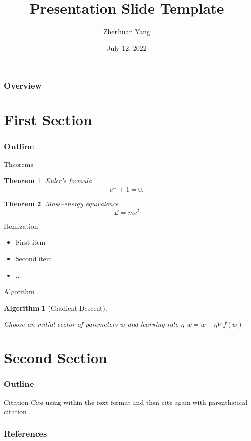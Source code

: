 \documentclass{beamer}
\title[Presentation]{Presentation Slide Template}
\author[ZY]{Zhenhuan Yang}
\institute[UAlbany]{Department of Mathematics \& Statistics\\University at Albany, SUNY}
\date{July 12, 2022}
\theoremstyle{mystyle}
\newtheorem{thm}{Theorem}
\newtheorem{code}{Algorithm}
\begin{document}
% 


\begin{frame}
	\titlepage
\end{frame}


\begin{frame}
	\frametitle{Overview}
	\tableofcontents
\end{frame}

\section[First]{First Section}

\begin{frame}
	\frametitle{Outline}
	\tableofcontents[currentsection]
\end{frame}

\begin{frame}{Theorems}
\begin{thm}\label{thm:euler}
Euler's formula
\[
	e^{i\pi} + 1 = 0.
\]
\end{thm}
\begin{thm}\label{thm:einstein}
Mass–energy equivalence
\[
	E = mc^2
\]
\end{thm}
\end{frame}

\begin{frame}{Itemization}
\begin{itemize}
\item First item 
\item Second item
\item ...	
\end{itemize}
	
\end{frame}

\begin{frame}{Algorithm}
\begin{code}[Gradient Descent]
\begin{algorithmic}[1]
\STATE Choose an initial vector of parameters $w$ and learning rate $\eta$
\STATE $w = w - \eta\nabla f(w)$
\ENDWHILE
\end{algorithmic}
\end{code}

\end{frame}


\section[Second]{Second Section}

\begin{frame}
	\frametitle{Outline}
	\tableofcontents[currentsection]
\end{frame}

\begin{frame}{Citation}
Cite \citet{anonymous} using within the text format and then cite again with parenthetical citation \citep{langley00}.

\end{frame}

\begin{frame}[allowframebreaks]
	\frametitle{References}
	
	{\footnotesize
	}
\end{frame}
\end{document}
